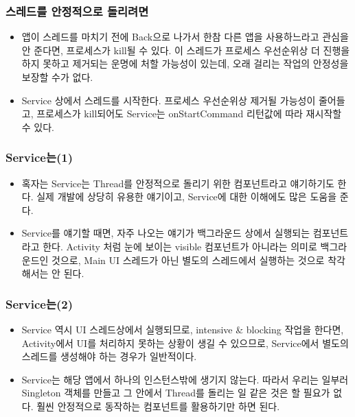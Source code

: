\documentclass{beamer}
\begin{document}
\begin{frame}
\frametitle{스레드를 안정적으로 돌리려면}
\begin{itemize}
\item 앱이 스레드를 마치기 전에 Back으로 나가서 한참 다른 앱을 사용하느라고 관심을 안 준다면, 프로세스가 kill될 수 있다. 이 스레드가 프로세스 우선순위상 더 진행을 하지 못하고 제거되는 운명에 처할 가능성이 있는데, 오래 걸리는 작업의 안정성을 보장할 수가 없다.
\item Service 상에서 스레드를 시작한다. 프로세스 우선순위상 제거될 가능성이 줄어들고, 프로세스가 kill되어도 Service는 onStartCommand 리턴값에 따라 재시작할 수 있다.
\end{itemize}
\end{frame}

\begin{frame}
\frametitle{Service는(1)}
\begin{itemize}
\item 혹자는 Service는 Thread를 안정적으로 돌리기 위한 컴포넌트라고 얘기하기도 한다. 실제 개발에 상당히 유용한 얘기이고, Service에 대한 이해에도 많은 도움을 준다.\\
\item Service를 얘기할 때면, 자주 나오는 얘기가 백그라운드 상에서 실행되는 컴포넌트라고 한다. Activity 처럼 눈에 보이는 visible 컴포넌트가 아니라는 의미로 백그라운드인 것으로, Main UI 스레드가 아닌 별도의 스레드에서 실행하는 것으로 착각해서는 안 된다.\\
\end{itemize}
\end{frame}

\begin{frame}
\frametitle{Service는(2)}
\begin{itemize}
\item Service 역시 UI 스레드상에서 실행되므로, intensive \& blocking 작업을 한다면, Activity에서 UI를 처리하지 못하는 상황이 생길 수 있으므로, Service에서 별도의 스레드를 생성해야 하는 경우가 일반적이다.\\
\item Service는 해당 앱에서 하나의 인스턴스밖에 생기지 않는다. 따라서 우리는 일부러 Singleton 객체를 만들고 그 안에서 Thread를 돌리는 일 같은 것은 할 필요가 없다. 훨씬 안정적으로 동작하는 컴포넌트를 활용하기만 하면 된다.
\end{itemize}
\end{frame}
\end{document}
